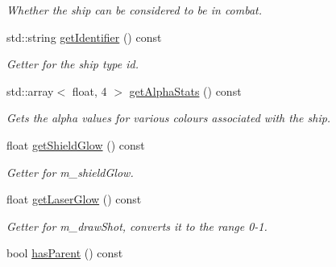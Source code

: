 \begin{DoxyCompactItemize}
\begin{DoxyCompactList}\small\item\em Whether the ship can be considered to be in combat. \end{DoxyCompactList}\item 
\hypertarget{classship_ab954d0adc48f4b6a358863969a40d478}{std\-::string \hyperlink{classship_ab954d0adc48f4b6a358863969a40d478}{get\-Identifier} () const }\label{classship_ab954d0adc48f4b6a358863969a40d478}

\begin{DoxyCompactList}\small\item\em Getter for the ship type id. \end{DoxyCompactList}\item 
\hypertarget{classship_a92cdedc492085eab5448222e5dc36296}{std\-::array$<$ float, 4 $>$ \hyperlink{classship_a92cdedc492085eab5448222e5dc36296}{get\-Alpha\-Stats} () const }\label{classship_a92cdedc492085eab5448222e5dc36296}

\begin{DoxyCompactList}\small\item\em Gets the alpha values for various colours associated with the ship. \end{DoxyCompactList}\item 
\hypertarget{classship_a1e4b3788fa205b41bad280859827d802}{float \hyperlink{classship_a1e4b3788fa205b41bad280859827d802}{get\-Shield\-Glow} () const }\label{classship_a1e4b3788fa205b41bad280859827d802}

\begin{DoxyCompactList}\small\item\em Getter for m\-\_\-shield\-Glow. \end{DoxyCompactList}\item 
\hypertarget{classship_a2a92ab0c77d62a5132ac69c19cb51292}{float \hyperlink{classship_a2a92ab0c77d62a5132ac69c19cb51292}{get\-Laser\-Glow} () const }\label{classship_a2a92ab0c77d62a5132ac69c19cb51292}

\begin{DoxyCompactList}\small\item\em Getter for m\-\_\-draw\-Shot, converts it to the range 0-\/1. \end{DoxyCompactList}\item 
\hypertarget{classship_ae9df18aea813f1007ab94462dec47c57}{bool \hyperlink{classship_ae9df18aea813f1007ab94462dec47c57}{has\-Parent} () const }\label{classship_ae9df18aea813f1007ab94462dec47c57}


\end{DoxyCompactItemize}
